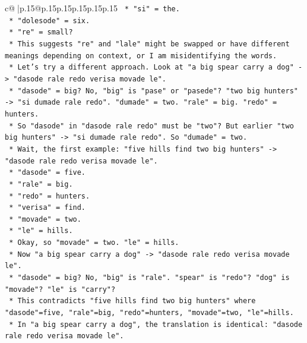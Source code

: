 \documentclass{article}
\begin{document}
{\begin{supertabular}{c@{$\;$}|p{.15\linewidth}@{}p{.15\linewidth}p{.15\linewidth}p{.15\linewidth}p{.15\linewidth}p{.15\linewidth}}
{{{\texttt{                        *   "si" = the.} \\
\texttt{                        *   "dolesode" = six.} \\
\texttt{                        *   "re" = small?} \\
\texttt{                    *   This suggests "re" and "lale" might be swapped or have different meanings depending on context, or I am misidentifying the words.} \\
\texttt{                    *   Let's try a different approach. Look at "a big spear carry a dog" {-}> "dasode rale redo verisa movade le".} \\
\texttt{                        *   "dasode" = big? No, "big" is "pase" or "pasede"? "two big hunters" {-}> "si dumade rale redo". "dumade" = two. "rale" = big. "redo" = hunters.} \\
\texttt{                        *   So "dasode" in "dasode rale redo" must be "two"? But earlier "two big hunters" {-}> "si dumade rale redo". So "dumade" = two.} \\
\texttt{                        *   Wait, the first example: "five hills find two big hunters" {-}> "dasode rale redo verisa movade le".} \\
\texttt{                            *   "dasode" = five.} \\
\texttt{                            *   "rale" = big.} \\
\texttt{                            *   "redo" = hunters.} \\
\texttt{                            *   "verisa" = find.} \\
\texttt{                            *   "movade" = two.} \\
\texttt{                            *   "le" = hills.} \\
\texttt{                        *   Okay, so "movade" = two. "le" = hills.} \\
\texttt{                        *   Now "a big spear carry a dog" {-}> "dasode rale redo verisa movade le".} \\
\texttt{                            *   "dasode" = big? No, "big" is "rale". "spear" is "redo"? "dog" is "movade"? "le" is "carry"?} \\
\texttt{                            *   This contradicts "five hills find two big hunters" where "dasode"=five, "rale"=big, "redo"=hunters, "movade"=two, "le"=hills.} \\
\texttt{                            *   In "a big spear carry a dog", the translation is identical: "dasode rale redo verisa movade le".} \\
}}}
\end{supertabular}}
\end{document}
